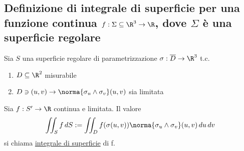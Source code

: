 \subsection{Definizione di integrale di superficie per una funzione continua
$f:\Sigma\subseteq\R^3\to\R$, dove $\Sigma$ è una superficie regolare}
\begin{definition}
  Sia $S$ una superficie regolare di parametrizzazione $\sigma:\overline{D}\to\R^3$ t.c. 
  \begin{enumerate}
    \item $D\subseteq \R^2$ misurabile
    \item $D\ni (u,v) \to \norma{\sigma_u\wedge\sigma_v}(u,v)$ sia limitata
  \end{enumerate}
  Sia $f:S' \to \R$ continua e limitata. Il valore
  $$\iint_{S} f \,dS := \iint_{D} f(\sigma(u,v))\norma{\sigma_u\wedge\sigma_v}(u,v) \,du\,dv$$
  si chiama \underline{integrale di superficie} di f.
\end{definition}